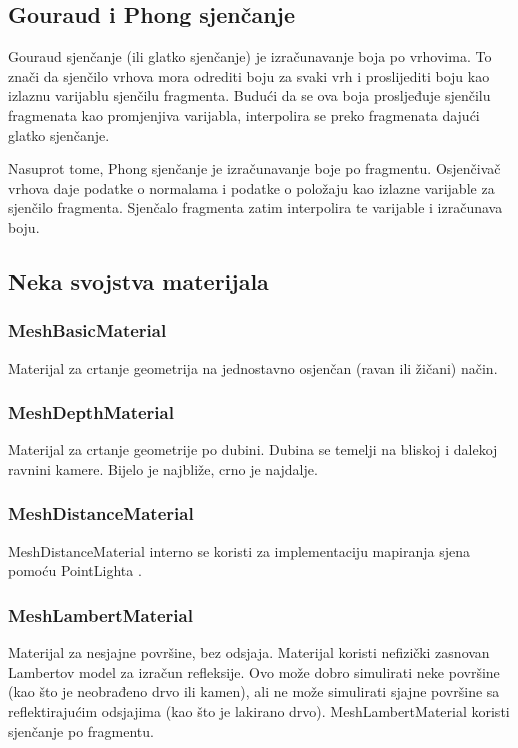 \documentclass[a4paper,12pt]{article}
\begin{document}
\subsection{Gouraud i Phong sjenčanje}

Gouraud sjenčanje (ili glatko sjenčanje) je izračunavanje boja po vrhovima. 
To znači da sjenčilo vrhova mora odrediti boju za svaki vrh i proslijediti boju kao izlaznu varijablu sjenčilu fragmenta. 
Budući da se ova boja prosljeđuje sjenčilu fragmenata kao promjenjiva varijabla, interpolira se preko fragmenata dajući glatko sjenčanje.

Nasuprot tome, Phong sjenčanje je izračunavanje boje po fragmentu. 
Osjenčivač vrhova daje podatke o normalama i podatke o položaju kao izlazne varijable za sjenčilo fragmenta. 
Sjenčalo fragmenta zatim interpolira te varijable i izračunava boju.

\subsection{Neka svojstva materijala}
\subsubsection{MeshBasicMaterial}

\hspace{10mm} Materijal za crtanje geometrija na jednostavno osjenčan (ravan ili žičani) način.

\subsubsection{MeshDepthMaterial}
\hspace{10mm} Materijal za crtanje geometrije po dubini. Dubina se temelji na bliskoj i dalekoj ravnini kamere. Bijelo je najbliže, crno je najdalje.

\subsubsection{MeshDistanceMaterial}
\hspace{10mm} MeshDistanceMaterial interno se koristi za implementaciju mapiranja sjena pomoću PointLighta .

\subsubsection{MeshLambertMaterial}
Materijal za nesjajne površine, bez odsjaja.
Materijal koristi nefizički zasnovan Lambertov model za izračun refleksije. Ovo može dobro simulirati neke površine (kao što je neobrađeno drvo ili kamen), ali ne može simulirati sjajne površine sa reflektirajućim odsjajima (kao što je lakirano drvo). MeshLambertMaterial koristi sjenčanje po fragmentu.
\end{document}
